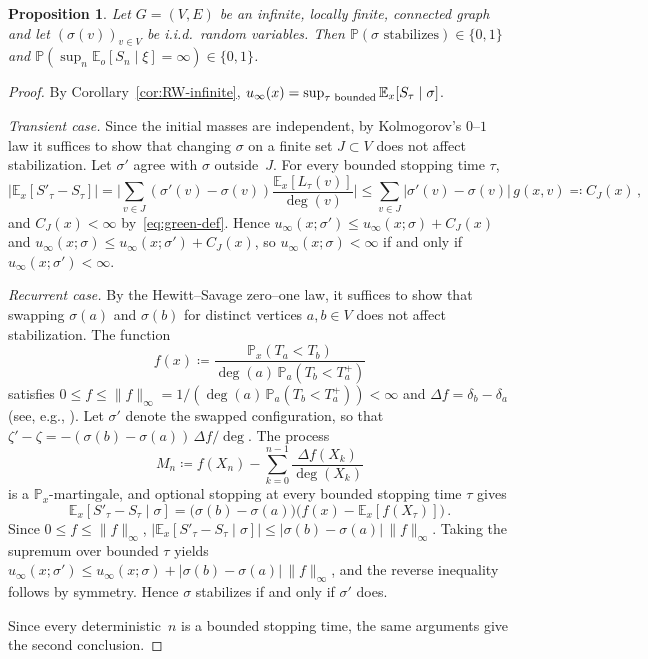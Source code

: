 \documentclass[11pt]{amsart}
\theoremstyle{plain}
\newtheorem{proposition}[theorem]{Proposition}
\theoremstyle{definition}
\newcommand{\E}{\mathbb{E}}
\renewcommand{\P}{\mathbb{P}}
\begin{document}
	
	\begin{proposition}\label{prop:01-law}
		Let $G=(V,E)$ be an infinite, locally finite, connected graph and let
		$(\sigma(v))_{v\in V}$ be i.i.d.\ random variables. Then
		$\P(\sigma \text{ stabilizes})\in\{0,1\}$ and $\P(\sup_n\E_o[S_n\mid\xi]=\infty)\in\{0,1\}$.
	\end{proposition}
	\begin{proof}
		By Corollary~\ref{cor:RW-infinite}, $u_\infty(x)=\sup_{\tau\textup{ bounded}}\E_x[S_\tau\mid\sigma]$.
		
		\emph{Transient case.} Since the initial masses are independent, by Kolmogorov's $0$--$1$ law it suffices to show that changing $\sigma$ on a finite set $J\subset V$ does not affect stabilization. Let $\sigma'$ agree with $\sigma$ outside~$J$. For every bounded stopping time $\tau$,
		\[
		\bigl|\E_x[S'_\tau-S_\tau]\bigr|=\biggl|\sum_{v\in J}(\sigma'(v)-\sigma(v))\frac{\E_x[L_\tau(v)]}{\deg(v)}\biggr|\leq\sum_{v\in J}|\sigma'(v)-\sigma(v)|\,g(x,v)\eqqcolon C_J(x)\,,
		\]
		and $C_J(x)<\infty$ by~\eqref{eq:green-def}. Hence $u_\infty(x;\sigma')\leq u_\infty(x;\sigma)+C_J(x)$ and $u_\infty(x;\sigma)\leq u_\infty(x;\sigma')+C_J(x)$, so $u_\infty(x;\sigma)<\infty$ if and only if $u_\infty(x;\sigma')<\infty$.
		
		\emph{Recurrent case.} By the Hewitt--Savage zero--one law, it suffices to show that swapping $\sigma(a)$ and $\sigma(b)$ for distinct vertices $a,b\in V$ does not affect stabilization.  The function
		\[
		f(x) \coloneqq \frac{\P_x(T_a<T_b)}{\deg(a)\,\P_a(T_b < T_a^+)}
		\]
		satisfies $0 \le f \le \|f\|_\infty= 1/(\deg(a)\,\P_a(T_b < T_a^+))<\infty$ and $\Delta f = \delta_b - \delta_a$ (see, e.g., \citet[Proposition~2.1 and eq.~(2.4)]{LP16}). Let $\sigma'$ denote the swapped configuration, so that $\zeta'-\zeta = -(\sigma(b)-\sigma(a))\,\Delta f/\deg$. The process
		\[
		M_n\coloneqq f(X_n)-\sum_{k=0}^{n-1}\frac{\Delta f(X_k)}{\deg(X_k)}
		\]
		is a $\P_x$-martingale, and optional stopping at every bounded stopping time $\tau$ gives
		\[
		\E_x[S'_\tau - S_\tau\mid\sigma] = \bigl(\sigma(b)-\sigma(a)\bigr)\bigl(f(x) - \E_x[f(X_\tau)]\bigr)\,.
		\]
		Since $0\leq f\leq\|f\|_\infty$, $|\E_x[S'_\tau - S_\tau\mid\sigma]|\leq|\sigma(b)-\sigma(a)|\,\|f\|_\infty$. Taking the supremum over bounded $\tau$ yields $u_\infty(x;\sigma')\leq u_\infty(x;\sigma)+|\sigma(b)-\sigma(a)|\,\|f\|_\infty$, and the reverse inequality follows by symmetry. Hence $\sigma$ stabilizes if and only if $\sigma'$ does.
		
		Since every deterministic~$n$ is a bounded stopping time, the same arguments give the second conclusion. %
	\end{proof}
	
\end{document}
